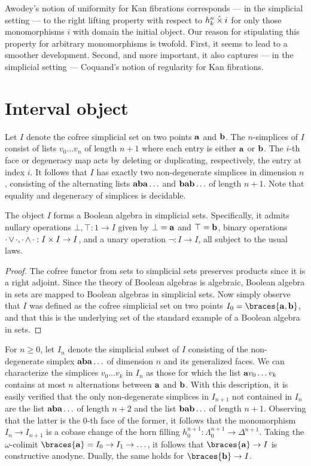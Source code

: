 \documentclass[reqno,10pt,a4paper,oneside]{amsart}
\begin{document}
Awodey's notion of uniformity for Kan fibrations corresponds --- in the simplicial setting --- to the right lifting property with respect to $h_k^n \mathbin{\hat{\times}} i$ for only those monomorphisms $i$ with domain the initial object.
Our reason for stipulating this property for arbitrary monomorphisms is twofold.
First, it seems to lead to a smoother development.
Second, and more important, it also captures --- in the simplicial setting --- Coquand's notion of regularity for Kan fibrations.
\section{Interval object}

Let $I$ denote the cofree simplicial set on two points $\mathbf{a}$ and $\mathbf{b}$.
The $n$-simplices of $I$ consist of lists $v_0 \ldots v_n$ of length $n+1$ where each entry is either $\mathbf{a}$ or $\mathbf{b}$.
The $i$-th face or degeneracy map acts by deleting or duplicating, respectively, the entry at index $i$.
It follows that $I$ has exactly two non-degenerate simplices in dimension $n$, consisting of the alternating lists $\mathbf{a} \mathbf{b} \mathbf{a} \ldots$ and $\mathbf{b} \mathbf{a} \mathbf{b} \ldots$ of length $n+1$.
Note that equality and degeneracy of simplices is decidable.

\begin{lemma}
The object $I$ forms a Boolean algebra in simplicial sets.
Specifically, it admits nullary operations $\bot, \top : 1 \to I$ given by $\bot = \mathbf{a}$ and $\top = \mathbf{b}$, binary operations $\mathop{\cdot} \vee \mathop{\cdot}, \mathop{\cdot} \wedge \mathop{\cdot} : I \times I \to I$, and a unary operation $\neg : I \to I$, all subject to the usual laws.
\end{lemma}

\begin{proof}
The cofree functor from sets to simplicial sets preserves products since it is a right adjoint.
Since the theory of Boolean algebras is algebraic, Boolean algebra in sets are mapped to Boolean algebras in simplicial sets.
Now simply observe that $I$ was defined as the cofree simplicial set on two points $I_0 = \braces{\ptA, \ptB}$, and that this is the underlying set of the standard example of a Boolean algebra in sets.
\end{proof}

For $n \geq 0$, let $I_n$ denote the simplicial subset of $I$ consisting of the non-degenerate simplex $\mathbf{a} \mathbf{b} \mathbf{a} \ldots$ of dimension $n$ and its generalized faces.
We can characterize the simplices $v_0 \ldots v_k$ in $I_n$ as those for which the list $\mathbf{a} v_0 \ldots v_k$ contains at most $n$ alternations between $\mathbf{a}$ and $\mathbf{b}$.
With this description, it is easily verified that the only non-degenerate simplices in $I_{n+1}$ not contained in $I_n$ are the list $\mathbf{a} \mathbf{b} \mathbf{a} \ldots$ of length $n+2$ and the list $\mathbf{b} \mathbf{a} \mathbf{b} \ldots$ of length $n+1$.
Observing that the latter is the $0$-th face of the former, it follows that the monomorphism $I_n \to I_{n+1}$ is a cobase change of the horn filling $h_{0}^{n+1} : \Lambda_0^{n+1} \to \Delta^{n+1}$.
Taking the $\omega$-colimit $\braces{\ptA} = I_0 \to I_1 \to \ldots$, it follows that $\braces{\ptA} \to I$ is constructive anodyne.
Dually, the same holds for $\braces{\ptB} \to I$.
\end{document}
